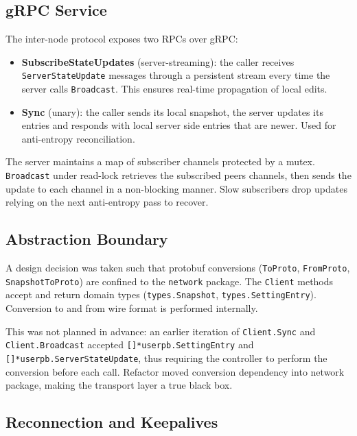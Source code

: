 \documentclass[conference]{IEEEtran}
\begin{document}
\subsection{gRPC Service}

The inter-node protocol exposes two RPCs over gRPC:

\begin{itemize}
  \item \textbf{SubscribeStateUpdates} (server-streaming): the caller receives
    \texttt{ServerStateUpdate} messages through a persistent stream every time
    the server calls \texttt{Broadcast}. This ensures real-time propagation of
    local edits.
  \item \textbf{Sync} (unary): the caller sends its local snapshot, the
    server updates its entries and responds with local server side entries that
    are newer. Used for anti-entropy reconciliation.
\end{itemize}

The server maintains a map of subscriber channels protected by a mutex.
\texttt{Broadcast} under read-lock retrieves the subscribed peers channels, then
sends the update to each channel in a non-blocking manner. Slow subscribers
drop updates relying on the next anti-entropy pass to recover.

\subsection{Abstraction Boundary}

A design decision was taken such that protobuf conversions
(\texttt{ToProto}, \texttt{FromProto}, \texttt{SnapshotToProto}) are
confined to the \texttt{network} package. The \texttt{Client} methods accept
and return domain types (\texttt{types.Snapshot}, \texttt{types.SettingEntry}).
Conversion to and from wire format is performed internally.

This was not planned in advance: an earlier iteration of \texttt{Client.Sync} and \texttt{Client.Broadcast}
accepted \texttt{[]*userpb.SettingEntry} and \texttt{[]*userpb.ServerStateUpdate},
thus requiring the controller to perform the conversion before each call.
Refactor moved conversion dependency into network package, making the transport
layer a true black box.

\subsection{Reconnection and Keepalives}
\end{document}
